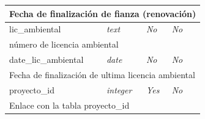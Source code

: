 \begin{longtable}{|l|l|l|l|l|}
	\multicolumn{ 5}{|l|}{Fecha de finalización de fianza (renovación)} \\ \hline
		lic\_ambiental & \textit{text} & \textit{No} & \textit{No} & \textit{} \\ \hline

	\multicolumn{ 5}{|l|}{número de licencia ambiental} \\ \hline
		date\_lic\_ambiental & \textit{date} & \textit{No} & \textit{No} & \textit{} \\ \hline

	\multicolumn{ 5}{|l|}{Fecha de finalización de ultima licencia ambiental} \\ \hline
		proyecto\_id & \textit{integer} & \textit{Yes} & \textit{No} & \textit{} \\ \hline

	\multicolumn{ 5}{|l|}{Enlace con la tabla proyecto\_id} \\ \hline
\end{longtable}



